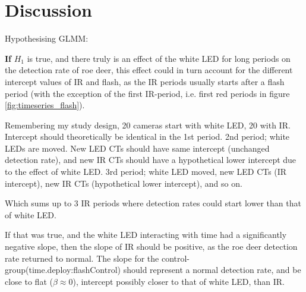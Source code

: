 \chapter{Discussion}



Hypothesising GLMM:

\textbf{If} $H_1$ is true, and there truly is an effect of the white LED for long periods on the detection rate of roe deer, this effect could in turn account for the different intercept values of IR and flash, as the IR periods usually starts after a flash period (with the exception of the first IR-period, i.e. first red periods in figure \vref{fig:timeseries_flash}).

Remembering my study design, 20 cameras start with white LED, 20 with IR.
Intercept should theoretically be identical in the 1st period.
2nd period; white LEDs are moved. New LED CTs should have same intercept (unchanged detection rate), and new IR CTs should have a hypothetical lower intercept due to the effect of white LED.
3rd period; white LED moved, new LED CTs (IR intercept), new IR CTs (hypothetical lower intercept), and so on.

Which sums up to 3 IR periods where detection rates could start lower than that of white LED.

If that was true, and the white LED interacting with time had a significantly negative slope, then the slope of IR should be positive, as the roe deer detection rate returned to normal.
The slope for the control-group(time.deploy:flashControl) should represent a normal detection rate, and be close to flat ($ \beta \approx 0$), intercept possibly closer to that of white LED, than IR.









